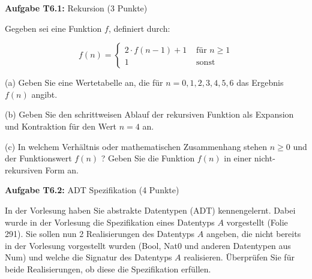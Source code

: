 \RequirePackage{fix-cm}


\newcommand{\obenlinks}{Übungen zur Vorlesung Informatik I}   %




\graphicspath{ {./images/} }

\textbf{Aufgabe T6.1:} Rekursion (3 Punkte)

Gegeben sei eine Funktion $f$, definiert durch:

$$
f(n)= \begin{cases}2 \cdot f(n-1)+1 & \text { für } n \geq 1 \\ 1 & \text { sonst }\end{cases}
$$

(a) Geben Sie eine Wertetabelle an, die für $n=0,1,2,3,4,5,6$ das Ergebnis $f(n)$ angibt.

(b) Geben Sie den schrittweisen Ablauf der rekursiven Funktion als Expansion und Kontraktion für den Wert $n=4$ an.

(c) In welchem Verhältnis oder mathematischen Zusammenhang stehen $n \geq 0$ und der Funktionswert $f(n)$ ? Geben Sie die Funktion $f(n)$ in einer nicht-rekursiven Form an.

\newpage

\textbf{Aufgabe T6.2:} ADT Spezifikation (4 Punkte)

In der Vorlesung haben Sie abstrakte Datentypen (ADT) kennengelernt. Dabei wurde in der Vorlesung die Spezifikation eines Datentyps $A$ vorgestellt (Folie 291). Sie sollen nun 2 Realisierungen des Datentyps $A$ angeben, die nicht bereits in der Vorlesung vorgestellt wurden (Bool, Nat0 und anderen Datentypen aus Num) und welche die Signatur des Datentyps $A$ realisieren. Überprüfen Sie für beide Realisierungen, ob diese die Spezifikation erfüllen.

